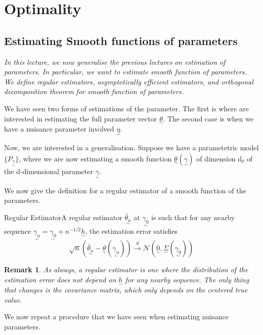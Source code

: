 \documentclass[twoside]{article}
\newtheorem{remark}[theorem]{Remark}
\newcommand{\utilde}{\underset{\sim}}
\begin{document}
\section{Optimality}
\subsection{Estimating Smooth functions of parameters}
\textit{In this lecture, we now generalise the previous lectures on estimation of parameters. In particular, we want to estimate smooth function of parameters. We define regular estimators, asymptotically efficient estimators, and orthogonal decomposition theorem for smooth function of parameters.}


We have seen two forms of estimations of the parameter. The first is where are interested in estimating the full parameter vector $\utilde{\theta}.$ The second case is when we have a nuisance parameter involved $\utilde{\eta}.$ 


Now, we are interested in a generalisation. Suppose we have a parametetric model $\{P_{\utilde{\gamma}}\}$, where we are now estimating a smooth function $\utilde{\theta}(\utilde{\gamma})$ of dimension $d_{\theta}$  of the d-dimensional parameter $\utilde{\gamma}.$

We now give the definition for a regular estimator of a smooth function of the parameters.
\begin{definition_exam}{Regular Estimator}{}A regular estimator $\tilde{\utilde{\theta_n}}$ at $\utilde{\gamma_0}$ is such that for any nearby sequence $\utilde{\gamma_n} = \utilde{\gamma_0} + n^{-1/2}\utilde{h}$, the estimation error satisfies 
$$
\sqrt{n}(\tilde{\utilde{\theta_n}} - \utilde{\theta}(\utilde{\gamma_n})) \xrightarrow{d} \mathcal{N}(\utilde{0}, \utilde{\Sigma}(\utilde{\gamma_0}))
$$
\end{definition_exam}

\begin{remark}As always, a regular estimator is one where the distribution of the estimation error does not depend on $\utilde{h}$ for any nearby sequence. The only thing that changes is the covariance matrix, which only depends on the centered true value.
\end{remark}

We now repeat a procedure that we have seen when estimating nuisance parameters.
\end{document}
